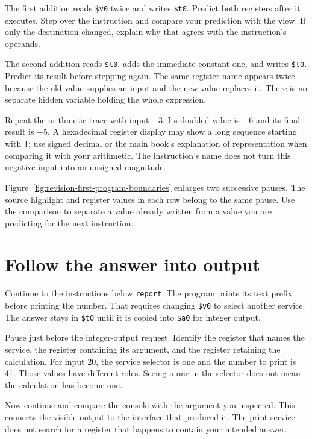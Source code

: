 The first addition reads \texttt{\$v0} twice and writes \texttt{\$t0}. Predict both
registers after it executes. Step over the instruction and compare your prediction
with the view. If only the destination changed, explain why that agrees with the
instruction's operands.

The second addition reads \texttt{\$t0}, adds the immediate constant one, and writes
\texttt{\$t0}. Predict its result before stepping again. The same register name
appears twice because the old value supplies an input and the new value replaces
it. There is no separate hidden variable holding the whole expression.

Repeat the arithmetic trace with input $-3$. Its doubled value is $-6$ and its
final result is $-5$. A hexadecimal register display may show a long sequence
starting with \texttt{f}; use signed decimal or the main book's explanation of
representation when comparing it with your arithmetic. The instruction's name
does not turn this negative input into an unsigned magnitude.

Figure~\ref{fig:revision-first-program-boundaries} enlarges two successive pauses.
The source highlight and register values in each row belong to the same pause.
Use the comparison to separate a value already written from a value you are
predicting for the next instruction.


\clearpage

\section{Follow the answer into output}

Continue to the instructions below \texttt{report}. The program prints its text
prefix before printing the number. That requires changing \texttt{\$v0} to select
another service. The answer stays in \texttt{\$t0} until it is copied into
\texttt{\$a0} for integer output.

Pause just before the integer-output request. Identify the register that names the
service, the register containing its argument, and the register retaining the
calculation. For input 20, the service selector is one and the number to print is
41. Those values have different roles. Seeing a one in the selector does not mean
the calculation has become one.

Now continue and compare the console with the argument you inspected. This connects
the visible output to the interface that produced it. The print service does not
search for a register that happens to contain your intended answer.


